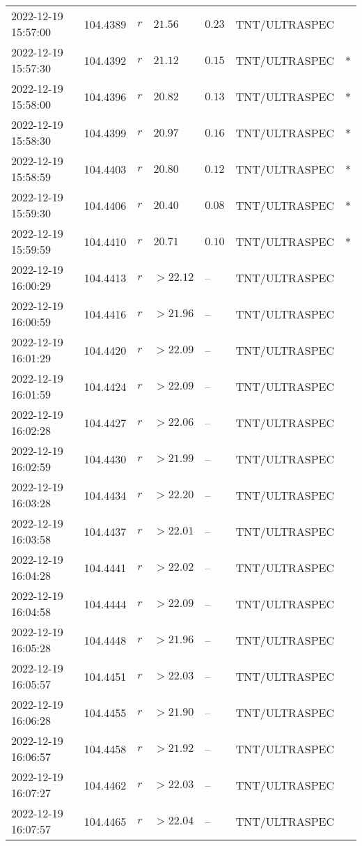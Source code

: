 \documentclass{nature_plusfigure}
\begin{document}
\begin{supplement}
\begin{center}
\begin{longtable}{lllllll}
2022-12-19 15:57:00 & 104.4389 & $r$ & $21.56$ & $0.23$ & TNT/ULTRASPEC &  \\ 
2022-12-19 15:57:30 & 104.4392 & $r$ & $21.12$ & $0.15$ & TNT/ULTRASPEC & * \\ 
2022-12-19 15:58:00 & 104.4396 & $r$ & $20.82$ & $0.13$ & TNT/ULTRASPEC & * \\ 
2022-12-19 15:58:30 & 104.4399 & $r$ & $20.97$ & $0.16$ & TNT/ULTRASPEC & * \\ 
2022-12-19 15:58:59 & 104.4403 & $r$ & $20.80$ & $0.12$ & TNT/ULTRASPEC & * \\ 
2022-12-19 15:59:30 & 104.4406 & $r$ & $20.40$ & $0.08$ & TNT/ULTRASPEC & * \\ 
2022-12-19 15:59:59 & 104.4410 & $r$ & $20.71$ & $0.10$ & TNT/ULTRASPEC & * \\ 
2022-12-19 16:00:29 & 104.4413 & $r$ & $>22.12$ & -- & TNT/ULTRASPEC &  \\ 
2022-12-19 16:00:59 & 104.4416 & $r$ & $>21.96$ & -- & TNT/ULTRASPEC &  \\ 
2022-12-19 16:01:29 & 104.4420 & $r$ & $>22.09$ & -- & TNT/ULTRASPEC &  \\ 
2022-12-19 16:01:59 & 104.4424 & $r$ & $>22.09$ & -- & TNT/ULTRASPEC &  \\ 
2022-12-19 16:02:28 & 104.4427 & $r$ & $>22.06$ & -- & TNT/ULTRASPEC &  \\ 
2022-12-19 16:02:59 & 104.4430 & $r$ & $>21.99$ & -- & TNT/ULTRASPEC &  \\ 
2022-12-19 16:03:28 & 104.4434 & $r$ & $>22.20$ & -- & TNT/ULTRASPEC &  \\ 
2022-12-19 16:03:58 & 104.4437 & $r$ & $>22.01$ & -- & TNT/ULTRASPEC &  \\ 
2022-12-19 16:04:28 & 104.4441 & $r$ & $>22.02$ & -- & TNT/ULTRASPEC &  \\ 
2022-12-19 16:04:58 & 104.4444 & $r$ & $>22.09$ & -- & TNT/ULTRASPEC &  \\ 
2022-12-19 16:05:28 & 104.4448 & $r$ & $>21.96$ & -- & TNT/ULTRASPEC &  \\ 
2022-12-19 16:05:57 & 104.4451 & $r$ & $>22.03$ & -- & TNT/ULTRASPEC &  \\ 
2022-12-19 16:06:28 & 104.4455 & $r$ & $>21.90$ & -- & TNT/ULTRASPEC &  \\ 
2022-12-19 16:06:57 & 104.4458 & $r$ & $>21.92$ & -- & TNT/ULTRASPEC &  \\ 
2022-12-19 16:07:27 & 104.4462 & $r$ & $>22.03$ & -- & TNT/ULTRASPEC &  \\ 
2022-12-19 16:07:57 & 104.4465 & $r$ & $>22.04$ & -- & TNT/ULTRASPEC &  \\ 

\end{longtable}
\end{center}
\end{supplement}
\end{document}
